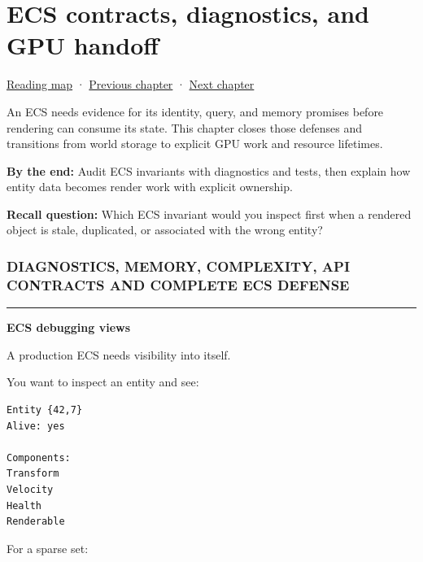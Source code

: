 \chapter{ECS contracts, diagnostics, and GPU handoff}\label{05-engine-i-ch018-ecs-contracts-diagnostics-and-gpu-handoff}\hypertarget{05-engine-i-ch018}{}\label{stagechapter:05-engine-i-ch018}

\hypertarget{05-engine-i-ch018-ecs-contracts-diagnostics-and-gpu-handoff}{}

\hyperref[volume-reading-map]{Reading map} · \hyperref[05-engine-i-ch017-ecs-performance-through-cache-and-scheduling]{Previous chapter} · \hyperref[06-engine-ii-ch028]{Next chapter}

An ECS needs evidence for its identity, query, and memory promises before rendering can consume its state. This chapter closes those defenses and transitions from world storage to explicit GPU work and resource lifetimes.

\textbf{By the end:} Audit ECS invariants with diagnostics and tests, then explain how entity data becomes render work with explicit ownership.

\textbf{Recall question:} Which ECS invariant would you inspect first when a rendered object is stale, duplicated, or associated with the wrong entity?

\subsection{DIAGNOSTICS, MEMORY, COMPLEXITY, API CONTRACTS AND COMPLETE ECS DEFENSE}\label{05-engine-i-ch018-diagnostics-memory-complexity-api-contracts-and-complete-ecs-defense}

\hypertarget{05-engine-i-ch018-diagnostics-memory-complexity-api-contracts-and-complete-ecs-defense}{}

\begin{center}\rule{0.5\linewidth}{0.5pt}\end{center}

\textbf{ECS debugging views}

A production ECS needs visibility into itself.

You want to inspect an entity and see:

\begin{verbatim}
Entity {42,7}
Alive: yes

Components:
Transform
Velocity
Health
Renderable
\end{verbatim}

For a sparse set:

